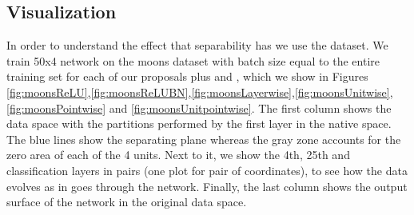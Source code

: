 \subsection{Visualization}\label{subsec:visualization}


In order to understand the effect that separability has we use the \moons dataset. We train 50x4 network on the moons dataset with batch size equal to the entire training set for each of our proposals plus \ReLU and \ReLUBN, which we show in Figures \ref{fig:moonsReLU},\ref{fig:moonsReLUBN},\ref{fig:moonsLayerwise},\ref{fig:moonsUnitwise},\ref{fig:moonsPointwise} and \ref{fig:moonsUnitpointwise}. The first column shows the data space with the partitions performed by the first layer in the native space. The blue lines show the separating plane whereas the gray zone accounts for the zero area of each of the 4 units. Next to it, we show the 4th, 25th and classification layers in pairs (one plot for pair of coordinates), to see how the data evolves as in goes through the network. Finally, the last column shows the output surface of the network in the original data space. 


